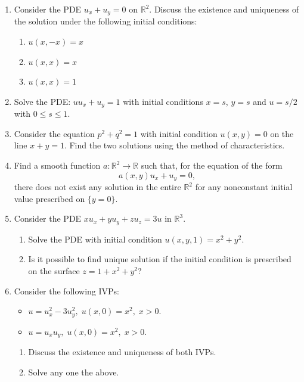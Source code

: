 \documentclass[11pt,a4paper]{article}
\begin{document}
\begin{enumerate}
\item Consider the PDE $u_x+u_y = 0$ on $\mathbb{R}^2$. Discuss the existence and uniqueness of the solution under the following initial conditions:
\begin{enumerate}
    \item $u(x, -x) = x$
    \item $u(x, x) = x$
    \item $u(x, x) = 1$
\end{enumerate}

\item Solve the PDE: $u u_x + u_y = 1$ with initial conditions $x = s$, $y = s$ and $u = s/2$ with $0 \leq s \leq 1$.

\item Consider the equation $p^2 + q^2 = 1$ with initial condition $u(x, y) = 0$ on the line $x+y = 1$. Find the two solutions using the method of characteristics.

\item Find a smooth function $a : \mathbb{R}^2 \to \mathbb{R}$ such that, for the equation of the form
\[a(x, y) u_x + u_y = 0,\]
there does not exist any solution in the entire $\mathbb{R}^2$ for any nonconstant initial value prescribed on $\{y = 0\}$.

\item Consider the PDE $x u_x + y u_y + z u_z = 3u$ in $\mathbb{R}^3$.
\begin{enumerate}
    \item Solve the PDE with initial condition $u(x, y, 1) = x^2 + y^2$.
    \item Is it possible to find unique solution if the initial condition is prescribed on the surface $z = 1 + x^2 + y^2$?
\end{enumerate}

\item Consider the following IVPs:
\begin{itemize}
    \item[A.] $u = u_x^2 - 3u_y^2, \; u(x, 0) = x^2, \; x > 0$.
    \item[B.] $u = u_x u_y, \; u(x, 0) = x^2, \; x > 0$.
\end{itemize}
\begin{enumerate}
    \item Discuss the existence and uniqueness of both IVPs.
    \item Solve any one the above.
\end{enumerate}


\end{enumerate}
\end{document}
